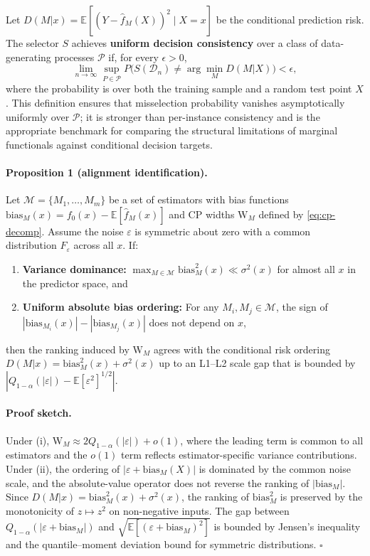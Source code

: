 \documentclass[a4paper,11pt]{article}
\begin{document}
Let $D(M|x) = \mathbb{E}[(Y - \hat{f}_M(X))^2 \mid X = x]$ be the conditional prediction risk. The selector $S$ achieves \textbf{uniform decision consistency} over a class of data-generating processes $\mathcal{P}$ if, for every $\epsilon > 0$,
\[
\lim_{n \to \infty} \sup_{P \in \mathcal{P}} P\bigl(S(\mathcal{D}_n) \neq \arg\min_M D(M|X)\bigr) < \epsilon,
\]
where the probability is over both the training sample and a random test point $X$. This definition ensures that misselection probability vanishes asymptotically uniformly over $\mathcal{P}$; it is stronger than per-instance consistency and is the appropriate benchmark for comparing the structural limitations of marginal functionals against conditional decision targets.

\paragraph{Proposition 1 (alignment identification).}
Let $\mathcal{M} = \{M_1, \ldots, M_m\}$ be a set of estimators with bias functions $\text{bias}_M(x) = f_0(x) - \mathbb{E}[\hat{f}_M(x)]$ and CP widths $\text{W}_M$ defined by \eqref{eq:cp-decomp}. Assume the noise $\varepsilon$ is symmetric about zero with a common distribution $F_\varepsilon$ across all $x$. If:
\begin{enumerate}
    \item[(i)] \textbf{Variance dominance:} $\max_{M \in \mathcal{M}} \text{bias}_M^2(x) \ll \sigma^2(x)$ for almost all $x$ in the predictor space, and
    \item[(ii)] \textbf{Uniform absolute bias ordering:} For any $M_i, M_j \in \mathcal{M}$, the sign of $|\text{bias}_{M_i}(x)| - |\text{bias}_{M_j}(x)|$ does not depend on $x$,
\end{enumerate}
then the ranking induced by $\text{W}_M$ agrees with the conditional risk ordering $D(M|x) = \text{bias}_M^2(x) + \sigma^2(x)$ up to an L1--L2 scale gap that is bounded by $|Q_{1-\alpha}(|\varepsilon|) - \mathbb{E}[\varepsilon^2]^{1/2}|$.

\paragraph{Proof sketch.}
Under (i), $\text{W}_M \approx 2Q_{1-\alpha}(|\varepsilon|) + o(1)$, where the leading term is common to all estimators and the $o(1)$ term reflects estimator-specific variance contributions. Under (ii), the ordering of $|\varepsilon + \text{bias}_M(X)|$ is dominated by the common noise scale, and the absolute-value operator does not reverse the ranking of $|\text{bias}_M|$. Since $D(M|x) = \text{bias}_M^2(x) + \sigma^2(x)$, the ranking of $\text{bias}_M^2$ is preserved by the monotonicity of $z \mapsto z^2$ on non-negative inputs. The gap between $Q_{1-\alpha}(|\varepsilon + \text{bias}_M|)$ and $\sqrt{\mathbb{E}[(\varepsilon + \text{bias}_M)^2]}$ is bounded by Jensen's inequality and the quantile--moment deviation bound for symmetric distributions. $\square$
\end{document}
